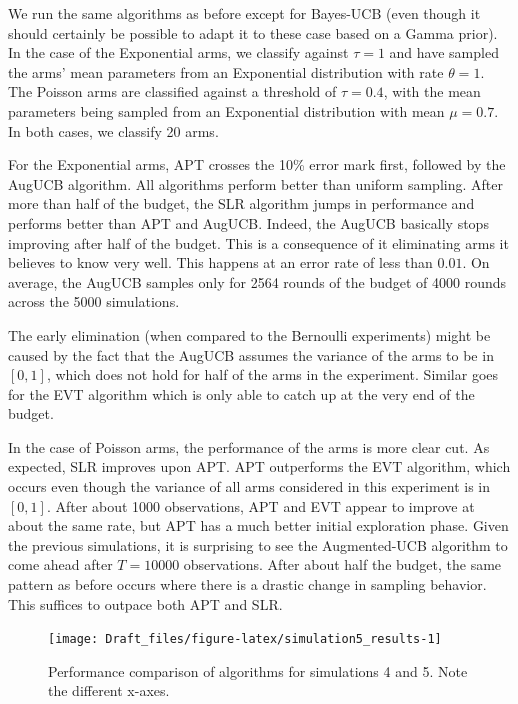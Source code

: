 \documentclass[11pt,]{article}
\begin{document}
We run the same algorithms as before except for Bayes-UCB (even though
it should certainly be possible to adapt it to these case based on a
Gamma prior). In the case of the Exponential arms, we classify against
\(\tau = 1\) and have sampled the arms' mean parameters from an
Exponential distribution with rate \(\theta = 1\). The Poisson arms are
classified against a threshold of \(\tau = 0.4\), with the mean
parameters being sampled from an Exponential distribution with mean
\(\mu = 0.7\). In both cases, we classify 20 arms.

For the Exponential arms, APT crosses the 10\% error mark first,
followed by the AugUCB algorithm. All algorithms perform better than
uniform sampling. After more than half of the budget, the SLR algorithm
jumps in performance and performs better than APT and AugUCB. Indeed,
the AugUCB basically stops improving after half of the budget. This is a
consequence of it eliminating arms it believes to know very well. This
happens at an error rate of less than \(0.01\). On average, the AugUCB
samples only for 2564 rounds of the budget of 4000 rounds across the
5000 simulations.

The early elimination (when compared to the Bernoulli experiments) might
be caused by the fact that the AugUCB assumes the variance of the arms
to be in \([0,1]\), which does not hold for half of the arms in the
experiment. Similar goes for the EVT algorithm which is only able to
catch up at the very end of the budget.

In the case of Poisson arms, the performance of the arms is more clear
cut. As expected, SLR improves upon APT. APT outperforms the EVT
algorithm, which occurs even though the variance of all arms considered
in this experiment is in \([0,1]\). After about 1000 observations, APT
and EVT appear to improve at about the same rate, but APT has a much
better initial exploration phase. Given the previous simulations, it is
surprising to see the Augmented-UCB algorithm to come ahead after
\(T=10000\) observations. After about half the budget, the same pattern
as before occurs where there is a drastic change in sampling behavior.
This suffices to outpace both APT and SLR.

\begin{figure}

{\centering \texttt{[image: Draft\_files/figure-latex/simulation5\_results-1]} 

}

\caption{Performance comparison of algorithms for simulations 4 and 5. Note the different x-axes.}\label{fig:simulation5_results}
\end{figure}
\end{document}
